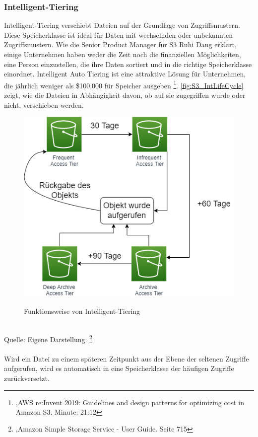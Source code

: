 \subsubsection{Intelligent-Tiering}
Intelligent-Tiering verschiebt Dateien auf der Grundlage von Zugriffsmustern. Diese Speicherklasse ist ideal für Daten mit wechselnden oder unbekannten Zugriffsmustern. 
Wie die Senior Product Manager für S3 Ruhi Dang erklärt, einige Unternehmen haben weder die Zeit noch die finanziellen Möglichkeiten, eine Person einzustellen, die ihre Daten sortiert und in die richtige Speicherklasse einordnet. Intelligent Auto Tiering ist eine attraktive Lösung für Unternehmen, die jährlich weniger als \$100,000 für Speicher ausgeben \footnote{\cite{AMZ16},AWS re:Invent 2019: Guidelines and design patterns for optimizing cost in Amazon S3. Minute: 21:12}.
\autoref{fig:S3_IntLifeCycle} zeigt, wie die Dateien in Abhängigkeit davon, ob auf sie zugegriffen wurde oder nicht, verschieben werden. 
\begin{figure}[h!]
  \centering
  \includegraphics[scale=0.7]{sources/S3_IntLifeCycle}
  \caption[Funktionsweise von Intelligent-Tiering]{}\label{fig:S3_IntLifeCycle} Funktionsweise von Intelligent-Tiering
\end{figure}\\
Quelle: Eigene Darstellung. \footnote{\cite{AMZ18},Amazon Simple Storage Service - User Guide. Seite 715}
\\\\
Wird ein Datei zu einem späteren Zeitpunkt aus der Ebene der seltenen Zugriffe aufgerufen, wird es automatisch in eine Speicherklasse der häufigen Zugriffe zurückversetzt.















